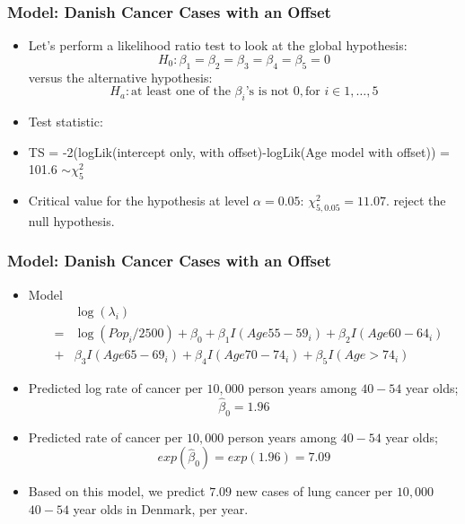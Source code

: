 \documentclass[10pt,xcolor={svgnames},t]{beamer}
\begin{document}
\begin{frame}
	\frametitle{Model: Danish Cancer Cases with an Offset}
	
	\begin{itemize}
		\item Let's perform a likelihood ratio test to look at the global hypothesis:
		\[ H_0 : \beta_1 = \beta_2 = \beta_3 = \beta_4 =\beta_5 =0
		\]
		versus the alternative hypothesis:
		\[ H_a : \text{at least one of the } \beta_i \text{'s is not } 0, \text{for } i\in 1,\ldots,5
		\] 
				\bigskip
		\item Test statistic:
		\item[] TS = -2(logLik(intercept only, with offset)-logLik(Age model with offset)) = 101.6 $\sim \chi_5^2$
				\bigskip
		\item Critical value for the hypothesis at level $\alpha=0.05$: $\chi_{5,0.05}^2 = 11.07$. reject the null hypothesis.
	\end{itemize}
	
	
\end{frame}
%
\begin{frame}
	\frametitle{Model: Danish Cancer Cases with an Offset}
	
	\begin{itemize}
		\item Model
		\begin{eqnarray*}
			&&\log(\lambda_i ) \\
			&=& \log(Pop_i/2500) + \beta_0 +\beta_1 I(Age55-59_i)+\beta_2 I(Age60-64_i) \\
			&+&\beta_3 I(Age65-69_i)+\beta_4 I(Age70-74_i)+\beta_5 I(Age>74_i) 
		\end{eqnarray*} 
		\item Predicted log rate of cancer per $10,000$ person years among $40-54$ year olds;
		\[ \hat{\beta}_0=1.96
		\]
		\item Predicted rate of cancer per $10,000$ person years among $40-54$ year olds;
		\[ exp(\hat{\beta}_0)=exp(1.96)=7.09
		\]
		\item Based on this model, we predict $7.09$ new cases of lung cancer per $10,000$ $40-54$ year olds in Denmark, per year.
	\end{itemize}
	
	
\end{frame}
\end{document}
